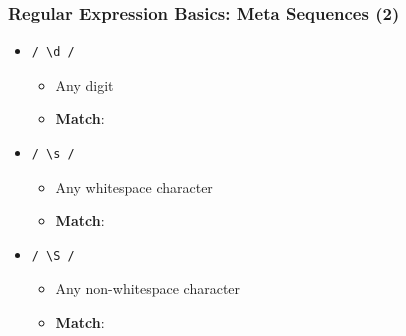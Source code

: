 \documentclass{beamer}
\begin{document}
\begin{frame}[fragile]
    \frametitle{Regular Expression Basics: Meta Sequences (2)}
    \begin{itemize}
        \item \begin{verbatim}/ \d /\end{verbatim}
        \begin{itemize}
            \item Any digit
            \item \textbf{Match}: \texttt{\colorbox{red!90}{}\colorbox{blue!50}{}\colorbox{red!90}{}\colorbox{blue!50}{}\colorbox{red!90}{\makebox{\strut ;}}}
        \end{itemize}
        \item \begin{verbatim}/ \s /\end{verbatim}
        \begin{itemize}
            \item Any whitespace character
            \item \textbf{Match}: \texttt{\colorbox{red!90}{}\colorbox{blue!50}{\makebox[1em]{\strut}}\colorbox{red!90}{}\colorbox{blue!50}{\makebox[1em]{\strut}}\colorbox{red!90}{}\colorbox{blue!50}{\makebox[1em]{\strut}}\colorbox{red!90}{\makebox{\strut \$!-:;}}}
        \end{itemize}
        \item \begin{verbatim}/ \S /\end{verbatim}
        \begin{itemize}
            \item Any non-whitespace character
            \item \textbf{Match}: \texttt{\colorbox{blue!50}{}\colorbox{red!90}{\makebox[1em]{\strut}}\colorbox{blue!50}{}\colorbox{red!90}{\makebox[1em]{\strut}}\colorbox{blue!50}{}\colorbox{red!90}{\makebox[1em]{\strut}}\colorbox{blue!50}{\makebox{\strut \$!-:;}}}
        \end{itemize}
    \end{itemize}
\end{frame}
\end{document}
